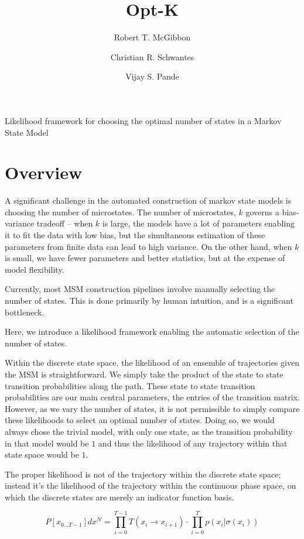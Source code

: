 \documentclass[twocolumn,floatfix,nofootinbib,aps]{revtex4-1}
\begin{document}
\title{Opt-K}
\author{Robert T. McGibbon}
\author{Christian R. Schwantes}
\author{Vijay S. Pande}
\maketitle


Likelihood framework for choosing the optimal number of states in a
Markov State Model

\section{Overview}

A significant challenge in the automated construction of markov state
models is choosing the number of microstates. The number of microstates,
$k$ governs a bias-variance tradeoff -- when $k$ is large, the models
have a lot of parameters enabling it to fit the data with low bias, but
the simultaneous estimation of these parameters from finite data can
lead to high variance. On the other hand, when $k$ is small, we have
fewer parameters and better statistics, but at the expense of model
flexibility.

Currently, most MSM construction pipelines involve manually selecting
the number of states. This is done primarily by human intuition, and is
a significant bottleneck.

Here, we introduce a likelihood framework enabling the automatic
selection of the number of states.

Within the discrete state space, the likelihood of an ensemble of
trajectories given the MSM is straightforward. We simply take the
product of the state to state transition probabilities along the path.
These state to state transition probabilities are our main central
parameters, the entries of the transition matrix. However, as we vary
the number of states, it is not permissible to simply compare these
likelihoods to select an optimal number of states. Doing so, we would
always chose the trivial model, with only one state, as the transition
probability in that model would be $1$ and thus the likelihood of any
trajectory within that state space would be $1$.

The proper likelihood is not of the trajectory within the discrete state
space; instead it's the likelihood of the trajectory within the
continuous phase space, on which the discrete states are merely an
indicator function basis. 

\begin{equation}
\label{eq:like}
P[x_{0...T-1}] dx^N = \prod_{i=0}^{T-1} T(x_i \rightarrow x_{i+1}) \cdot \prod_{i=0}^{T} p(x_{i} | \sigma(x_{i}))
\end{equation}
\end{document}
